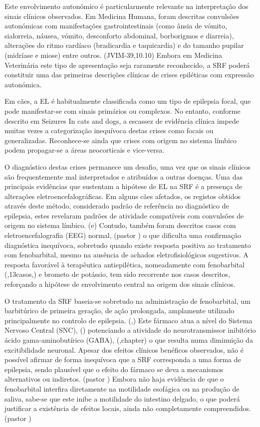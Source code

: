 Este envolvimento autonómico é particularmente relevante na interpretação dos sinais clínicos observados. Em Medicina Humana, foram descritas convulsões autonómicas com manifestações gastrointestinais (como ânsia de vómito, sialorreia, náusea, vómito, desconforto abdominal, borborigmos e diarreia), alterações do ritmo cardíaco (bradicardia e taquicardia) e do tamanho pupilar (midríase e miose) entre outros. (JVIM-39,10.10) Embora em Medicina Veterinária este tipo de apresentação seja raramente reconhecido, a SRF poderá constituir uma das primeiras descrições clínicas de crises epiléticas com expressão autonómica. \cite{Diop2025}


Em cães, a EL é habitualmente classificada como um tipo de epilepsia focal, que pode manifestar-se com sinais primários ou complexos. No entanto, conforme descrito em Seizures In cats and dogs, a escassez de evidência clínica impede muitas vezes a categorização inequívoca destas crises como focais ou generalizadas. Reconhece-se ainda que crises com origem no sistema límbico podem propagar-se a áreas neocorticais e vice-versa. 


O diagnóstico destas crises permanece um desafio, uma vez que os sinais clínicos são frequentemente mal interpretados e atribuídos a outras doenças. \cite{Diop2025}
Uma das principais evidências que sustentam a hipótese de EL na SRF é a presença de alterações eletroencefalográficas. Em alguns cães afetados, os registos obtidos através deste método, considerado padrão de referência no diagnóstico de epilepsia, estes revelaram padrões de atividade compatíveis com convulsões de origem no sistema límbico. (\cite{alemao}e) Contudo, também foram descritos casos com eletroencefalografia (EEG) normal, (pastor \cite{alemao}) o que dificulta uma confirmação diagnóstica inequívoca, sobretudo quando existe resposta positiva ao tratamento com fenobarbital, mesmo na ausência de achados eletrofisiológicos sugestivos.
A resposta favorável à terapêutica antiepilética, nomeadamente com fenobarbital (\cite{Alcoverro2014},13casos,\cite{alemao}) e brometo de potássio, \cite{Alcoverro2014} tem sido recorrente nos casos descritos, reforçando a hipótese de envolvimento central na origem dos sinais clínicos.


O tratamento da SRF baseia-se sobretudo na administração de fenobarbital, um barbitúrico de primeira geração, de ação prolongada, amplamente utilizado principalmente no controlo de epilepsia. (\cite{Papich2021},\cite{Scott2021}) Este fármaco atua a nível do Sistema Nervoso Central (SNC), (\cite{Papich2021}) potenciando a atividade do neurotransmissor inibitório ácido gama-aminobutírico (GABA), (\cite{Trinka2023},chapter) o que resulta numa diminuição da excitibilidade neuronal. Apesar dos efeitos clínicos benéficos observados, não é possível afirmar de forma inequívoca que a SRF corresponda a uma forma de epilepsia, sendo plausível que o efeito do fármaco se deva a mecanismos alternativos ou indiretos. (pastor \cite{alemao}) Embora não haja evidência de que o fenobarbital interfira diretamente na motilidade esofágica ou na produção de saliva, sabe-se que este inibe a motilidade do intestino delgado, o que poderá justificar a existência de efeitos locais, ainda não completamente compreendidos. (pastor \cite{alemao})



